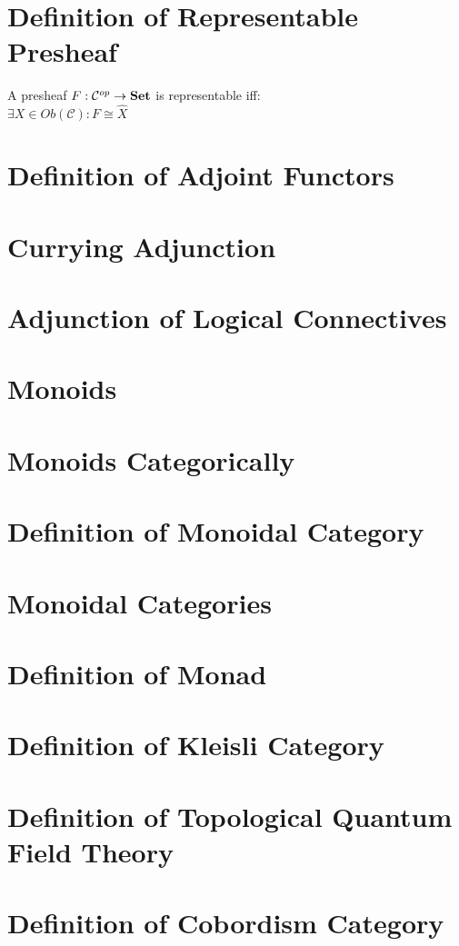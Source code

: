 \documentclass[a4paper, twoside, english, 11pt]{book}
\newcommand{\C}{\mathcal C}
\newcommand{\catname}[1]{{\normalfont\textbf{#1}}}
\newcommand{\Set}{\catname{Set}}
\begin{document}
\section{Definition of Representable Presheaf}

A presheaf $F : \C^{op} \rightarrow \Set$ is representable iff: \\

$\exists X \in Ob(\C) : F \cong \hat X$



\section{Definition of Adjoint Functors}
\section{Currying Adjunction}
\section{Adjunction of Logical Connectives}
\section{Monoids}
\section{Monoids Categorically}
\section{Definition of Monoidal Category}
\section{Monoidal Categories}
\section{Definition of Monad}
\section{Definition of Kleisli Category}
\section{Definition of Topological Quantum Field Theory}
\section{Definition of Cobordism Category}
\end{document}
